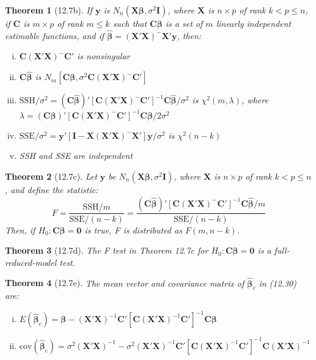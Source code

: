 \documentclass{article}
\newtheorem{theorem}{Theorem}[section]
\begin{document}
\begin{theorem}[12.7b]
If $\mathbf{y}$ is $N_n(\mathbf{X}\boldsymbol{\beta}, \sigma^2\mathbf{I})$, where $\mathbf{X}$ is $n \times p$ of rank $k < p \leq n$, if $\mathbf{C}$ is $m \times p$ of rank $m \leq k$ such that $\mathbf{C}\boldsymbol{\beta}$ is a set of $m$ linearly independent estimable functions, and if $\hat{\boldsymbol{\beta}} = (\mathbf{X}'\mathbf{X})^{-}\mathbf{X}'\mathbf{y}$, then:
\begin{enumerate}[(i)]
\item $\mathbf{C}(\mathbf{X}'\mathbf{X})^{-}\mathbf{C}'$ is nonsingular
\item $\mathbf{C}\hat{\boldsymbol{\beta}}$ is $N_m[\mathbf{C}\boldsymbol{\beta}, \sigma^2\mathbf{C}(\mathbf{X}'\mathbf{X})^{-}\mathbf{C}']$
\item $\text{SSH}/\sigma^2 = (\mathbf{C}\hat{\boldsymbol{\beta}})'[\mathbf{C}(\mathbf{X}'\mathbf{X})^{-}\mathbf{C}']^{-1}\mathbf{C}\hat{\boldsymbol{\beta}}/\sigma^2$ is $\chi^2(m,\lambda)$, where $\lambda = (\mathbf{C}\boldsymbol{\beta})'[\mathbf{C}(\mathbf{X}'\mathbf{X})^{-}\mathbf{C}']^{-1}\mathbf{C}\boldsymbol{\beta}/2\sigma^2$
\item $\text{SSE}/\sigma^2 = \mathbf{y}'[\mathbf{I} - \mathbf{X}(\mathbf{X}'\mathbf{X})^{-}\mathbf{X}']\mathbf{y}/\sigma^2$ is $\chi^2(n-k)$
\item SSH and SSE are independent
\end{enumerate}
\end{theorem}

\begin{theorem}[12.7c]
Let $\mathbf{y}$ be $N_n(\mathbf{X}\boldsymbol{\beta}, \sigma^2\mathbf{I})$, where $\mathbf{X}$ is $n \times p$ of rank $k < p \leq n$, and define the statistic:
\[F = \frac{\text{SSH}/m}{\text{SSE}/(n-k)} = \frac{(\mathbf{C}\hat{\boldsymbol{\beta}})'[\mathbf{C}(\mathbf{X}'\mathbf{X})^{-}\mathbf{C}']^{-1}\mathbf{C}\hat{\boldsymbol{\beta}}/m}{\text{SSE}/(n-k)}\]
Then, if $H_0: \mathbf{C}\boldsymbol{\beta} = \mathbf{0}$ is true, F is distributed as $F(m, n-k)$.
\end{theorem}

\begin{theorem}[12.7d]
The F test in Theorem 12.7c for $H_0: \mathbf{C}\boldsymbol{\beta} = \mathbf{0}$ is a full-reduced-model test.
\end{theorem}

\begin{theorem}[12.7e]
The mean vector and covariance matrix of $\hat{\boldsymbol{\beta}}_c$ in (12.30) are:
\begin{enumerate}[(i)]
\item $E(\hat{\boldsymbol{\beta}}_c) = \boldsymbol{\beta} - (\mathbf{X}'\mathbf{X})^{-1}\mathbf{C}'[\mathbf{C}(\mathbf{X}'\mathbf{X})^{-1}\mathbf{C}']^{-1}\mathbf{C}\boldsymbol{\beta}$
\item $\text{cov}(\hat{\boldsymbol{\beta}}_c) = \sigma^2(\mathbf{X}'\mathbf{X})^{-1} - \sigma^2(\mathbf{X}'\mathbf{X})^{-1}\mathbf{C}'[\mathbf{C}(\mathbf{X}'\mathbf{X})^{-1}\mathbf{C}']^{-1}\mathbf{C}(\mathbf{X}'\mathbf{X})^{-1}$
\end{enumerate}
\end{theorem}
\end{document}
